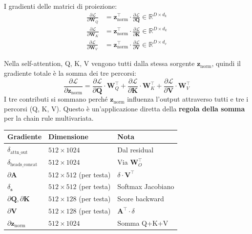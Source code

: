 \documentclass[12pt,a4paper]{article}
\begin{document}
\begin{formulabox}[title={B5.6 --- Proiezioni Q, K, V e combinazione}]
I gradienti delle matrici di proiezione:
\begin{align*}
    \frac{\partial \mathcal{L}}{\partial \mathbf{W}_Q} &= \mathbf{z}_{\text{norm}}^\top \cdot \frac{\partial \mathcal{L}}{\partial \mathbf{Q}} \in \mathbb{R}^{D \times d_k} \\[4pt]
    \frac{\partial \mathcal{L}}{\partial \mathbf{W}_K} &= \mathbf{z}_{\text{norm}}^\top \cdot \frac{\partial \mathcal{L}}{\partial \mathbf{K}} \in \mathbb{R}^{D \times d_k} \\[4pt]
    \frac{\partial \mathcal{L}}{\partial \mathbf{W}_V} &= \mathbf{z}_{\text{norm}}^\top \cdot \frac{\partial \mathcal{L}}{\partial \mathbf{V}} \in \mathbb{R}^{D \times d_v}
\end{align*}

Nella self-attention, Q, K, V vengono tutti dalla stessa sorgente $\mathbf{z}_{\text{norm}}$, quindi il gradiente totale \`e la somma dei tre percorsi:
\[
\frac{\partial \mathcal{L}}{\partial \mathbf{z}_{\text{norm}}} = \frac{\partial \mathcal{L}}{\partial \mathbf{Q}} \cdot \mathbf{W}_Q^\top + \frac{\partial \mathcal{L}}{\partial \mathbf{K}} \cdot \mathbf{W}_K^\top + \frac{\partial \mathcal{L}}{\partial \mathbf{V}} \cdot \mathbf{W}_V^\top
\]
I tre contributi si sommano perch\'e $\mathbf{z}_{\text{norm}}$ influenza l'output attraverso tutti e tre i percorsi (Q, K, V). Questo \`e un'applicazione diretta della \textbf{regola della somma} per la chain rule multivariata.
\end{formulabox}

\begin{notabox}
\begin{center}
\begin{tabular}{@{}lll@{}}
\toprule
\textbf{Gradiente} & \textbf{Dimensione} & \textbf{Nota} \\
\midrule
$\delta_{\text{attn\_out}}$ & $512 \times 1024$ & Dal residual \\
$\delta_{\text{heads\_concat}}$ & $512 \times 1024$ & Via $\mathbf{W}_O^\top$ \\
$\partial\mathbf{A}$ & $512 \times 512$ (per testa) & $\delta \cdot \mathbf{V}^\top$ \\
$\delta_{\mathbf{s}}$ & $512 \times 512$ (per testa) & Softmax Jacobiano \\
$\partial\mathbf{Q}, \partial\mathbf{K}$ & $512 \times 128$ (per testa) & Score backward \\
$\partial\mathbf{V}$ & $512 \times 128$ (per testa) & $\mathbf{A}^\top \cdot \delta$ \\
$\partial\mathbf{z}_{\text{norm}}$ & $512 \times 1024$ & Somma Q+K+V \\
\bottomrule
\end{tabular}
\end{center}
\end{notabox}
\end{document}
